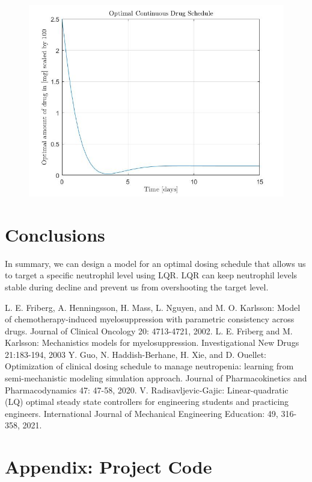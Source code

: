 \documentclass[11pt]{article}
\begin{document}
\begin{figure}[H]
    \includegraphics[width=\textwidth]{p2image2.jpg}
\end{figure}

\section*{Conclusions}

In summary, we can design a model for an optimal dosing schedule that allows us to target a specific neutrophil level using LQR. LQR can keep neutrophil levels stable during decline and prevent us from overshooting the target level.

\begin{thebibliography}{3}
   L. E. Friberg, A. Henningsson, H. Mass, L. Nguyen, and M. O. Karlsson: Model of chemotherapy-induced myelosuppression with parametric consistency across drugs. Journal of Clinical Oncology 20: 4713-4721, 2002.
   L. E. Friberg and M. Karlsson: Mechanistics models for myelosuppression. Investigational New Drugs 21:183-194, 2003
   Y. Guo, N. Haddish-Berhane, H. Xie, and D. Ouellet: Optimization of clinical dosing schedule to manage neutropenia: learning from semi-mechanistic modeling simulation approach. Journal of Pharmacokinetics and Pharmacodynamics 47: 47-58, 2020.
   V. Radisavljevic-Gajic: Linear-quadratic (LQ) optimal steady state controllers for engineering
  students and practicing engineers. International Journal of Mechanical Engineering Education:
  49, 316-358, 2021.
\end{thebibliography}

\section*{Appendix: Project Code}


\end{document}
